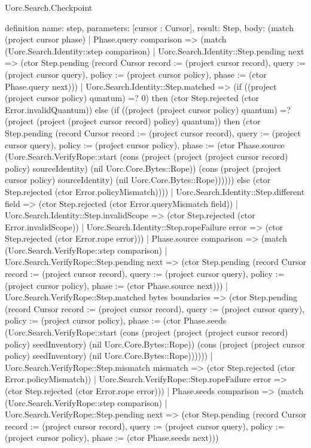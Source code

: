 \begin{lexlean}{Uorc.Search.Checkpoint}
\begin{semanticmodule}
definition{
  name: step,
  parameters: [cursor : Cursor],
  result: Step,
  body: (match (project cursor phase)
    | Phase.query comparison => (match (Uorc.Search.Identity::step comparison)
      | Uorc.Search.Identity::Step.pending next => (ctor Step.pending (record Cursor {record := (project cursor record), query := (project cursor query), policy := (project cursor policy), phase := (ctor Phase.query next)}))
      | Uorc.Search.Identity::Step.matched => (if ((project (project cursor policy) quantum) =? 0) then (ctor Step.rejected (ctor Error.invalidQuantum)) else (if ((project (project cursor policy) quantum) =? (project (project (project cursor record) policy) quantum)) then (ctor Step.pending (record Cursor {record := (project cursor record), query := (project cursor query), policy := (project cursor policy), phase := (ctor Phase.source (Uorc.Search.VerifyRope::start (cons (project (project (project cursor record) policy) sourceIdentity) (nil Uorc.Core.Bytes::Rope)) (cons (project (project cursor policy) sourceIdentity) (nil Uorc.Core.Bytes::Rope))))})) else (ctor Step.rejected (ctor Error.policyMismatch))))
      | Uorc.Search.Identity::Step.different field => (ctor Step.rejected (ctor Error.queryMismatch field))
      | Uorc.Search.Identity::Step.invalidScope => (ctor Step.rejected (ctor Error.invalidScope))
      | Uorc.Search.Identity::Step.ropeFailure error => (ctor Step.rejected (ctor Error.rope error)))
    | Phase.source comparison => (match (Uorc.Search.VerifyRope::step comparison)
      | Uorc.Search.VerifyRope::Step.pending next => (ctor Step.pending (record Cursor {record := (project cursor record), query := (project cursor query), policy := (project cursor policy), phase := (ctor Phase.source next)}))
      | Uorc.Search.VerifyRope::Step.matched bytes boundaries => (ctor Step.pending (record Cursor {record := (project cursor record), query := (project cursor query), policy := (project cursor policy), phase := (ctor Phase.seeds (Uorc.Search.VerifyRope::start (cons (project (project (project cursor record) policy) seedInventory) (nil Uorc.Core.Bytes::Rope)) (cons (project (project cursor policy) seedInventory) (nil Uorc.Core.Bytes::Rope))))}))
      | Uorc.Search.VerifyRope::Step.mismatch mismatch => (ctor Step.rejected (ctor Error.policyMismatch))
      | Uorc.Search.VerifyRope::Step.ropeFailure error => (ctor Step.rejected (ctor Error.rope error)))
    | Phase.seeds comparison => (match (Uorc.Search.VerifyRope::step comparison)
      | Uorc.Search.VerifyRope::Step.pending next => (ctor Step.pending (record Cursor {record := (project cursor record), query := (project cursor query), policy := (project cursor policy), phase := (ctor Phase.seeds next)}))
}
\end{semanticmodule}
\end{lexlean}
